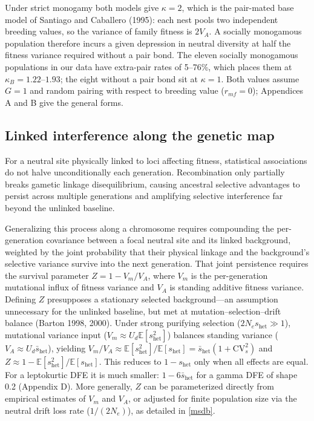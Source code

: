 \documentclass[12pt]{article}
\begin{document}
Under strict monogamy both models give $\kappa = 2$, which is the pair-mated base model of Santiago and Caballero (1995): each nest pools two independent breeding values, so the variance of family fitness is $2V_A$. A socially monogamous population therefore incurs a given depression in neutral diversity at half the fitness variance required without a pair bond. The eleven socially monogamous populations in our data have extra-pair rates of 5--76\%, which places them at $\kappa_B = 1.22\text{--}1.93$; the eight without a pair bond sit at $\kappa = 1$. Both values assume $G = 1$ and random pairing with respect to breeding value ($r_{mf} = 0$); Appendices A and B give the general forms.

\subsection{Linked interference along the genetic map}\label{sec:linkage}
For a neutral site physically linked to loci affecting fitness, statistical associations do not halve unconditionally each generation. Recombination only partially breaks gametic linkage disequilibrium, causing ancestral selective advantages to persist across multiple generations and amplifying selective interference far beyond the unlinked baseline. 

Generalizing this process along a chromosome requires compounding the per-generation covariance between a focal neutral site and its linked background, weighted by the joint probability that their physical linkage and the background's selective variance survive into the next generation. That joint persistence requires the survival parameter $Z = 1 - V_m/V_A$, where $V_m$ is the per-generation mutational influx of fitness variance and $V_A$ is standing additive fitness variance. Defining $Z$ presupposes a stationary selected background—an assumption unnecessary for the unlinked baseline, but met at mutation--selection--drift balance (Barton 1998, 2000). Under strong purifying selection ($2N_e s_\text{het} \gg 1$), mutational variance input ($V_m \approx U_d \mathbb{E}[s_\text{het}^2]$) balances standing variance ($V_A \approx U_d \bar{s}_\text{het}$), yielding $V_m/V_A \approx \mathbb{E}[s_\text{het}^2]/\mathbb{E}[s_\text{het}] = \bar{s}_\text{het}(1 + \mathrm{CV}_s^2)$ and $Z \approx 1 - \mathbb{E}[s_\text{het}^2]/\mathbb{E}[s_\text{het}]$. This reduces to $1 - s_\text{het}$ only when all effects are equal. For a leptokurtic DFE it is much smaller: $1 - 6\bar{s}_\text{het}$ for a gamma DFE of shape 0.2 (Appendix D). More generally, $Z$ can be parameterized directly from empirical estimates of $V_m$ and $V_A$, or adjusted for finite population size via the neutral drift loss rate ($1/(2N_e)$), as detailed in \autoref{msdb}.
\end{document}
